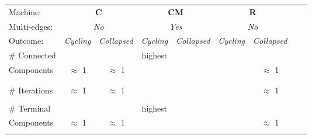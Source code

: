 \documentclass{tufte-handout}
\newcommand{\grayout}{\cellcolor{lightgray}}
\begin{document}
\begin{table}
\centering
\begin{tabular}{lcccccccc}\toprule
\addlinespace[3mm]
Machine:  & \multicolumn{2}{c}{\textbf{C}} & \multicolumn{2}{c}{\textbf{CM}} & \multicolumn{2}{c}{\textbf{R}} \\ \cmidrule(lr){2-3} \cmidrule(lr){4-5} \cmidrule(lr){6-7}
\addlinespace[2mm]

Multi-edges: & \multicolumn{2}{c}{\textit{No}} & \multicolumn{2}{c}{\textit{Yes}} & \multicolumn{2}{c}{\textit{No}} \\ \cmidrule(lr){2-3} \cmidrule(lr){4-5} \cmidrule(lr){6-7}
\addlinespace[2mm]

Outcome: & \textit{Cycling} & \textit{Collapsed} & \textit{Cycling} & \textit{Collapsed} & \textit{Cycling} & \textit{Collapsed} \\ \cmidrule(lr){2-2} \cmidrule(lr){3-3} \cmidrule(lr){4-4} \cmidrule(lr){5-5} \cmidrule(lr){6-6} \cmidrule(lr){7-7}
\# Connected &  &  & highest & \grayout & \grayout & \\
Components & $\approx$ 1 & $\approx$ 1 & & \grayout & \grayout & $\approx$ 1  \\
  &  &  &  & \grayout & \grayout & \\
\addlinespace[2mm]

  &  &  &  & \grayout & \grayout & \\
\# Iterations & $\approx$ 1 & $\approx$ 1 & & \grayout & \grayout & $\approx$ 1  \\
  &  &  &  & \grayout & \grayout & \\
\addlinespace[2mm]

\# Terminal &  &  & highest & \grayout & \grayout & \\
Components & $\approx$ 1 & $\approx$ 1 & & \grayout & \grayout & $\approx$ 1  \\
  &  &  &  & \grayout & \grayout & \\ \bottomrule
\end{tabular}
\label{tab:TabQ}
\end{table}
\hspace{2mm}\caption{Table \ref{tab:TabQ}: Comparison of Graph Measures Across (Machine+Outcome)s}
\vspace{3mm}

\clearpage
\end{document}
